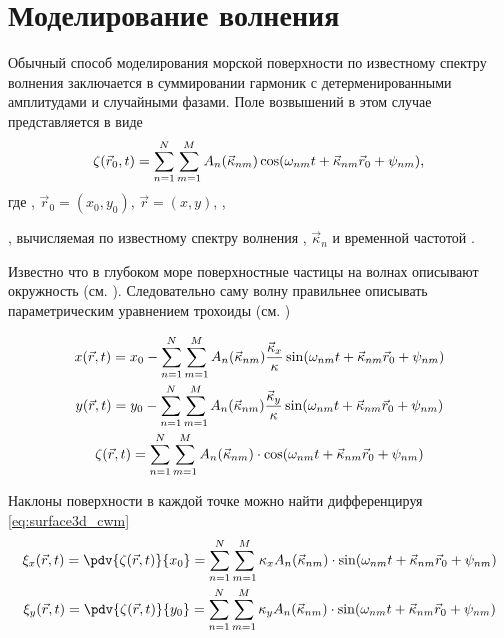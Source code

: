 \section*{Моделирование волнения}%

Обычный способ моделирования морской поверхности по известному спектру волнения
заключается в суммировании гармоник с детерменированными амплитудами и
случайными фазами. Поле возвышений в этом случае  представляется в виде
\begin{equation}
    \label{eq:surface3d_default}
    \zeta(\vec r_0,t) = \sum\limits_{n=1}^{N} \sum\limits_{m=1}^{M} A_n(\vec \kappa_{nm}) \cos(\omega_{nm}t + \vec \kappa_{nm}\vec r_0 + \psi_{nm}),    \\
\end{equation}
где ,  
$\vec r_0 = (x_0, y_0)$, $\vec r = (x, y)$, 
, 

, вычисляемая по известному спектру волнения \cite{ryabkova},
$\vec \kappa_n$ и временной частотой
 \cite{pustovoytenko}.


Известно что в глубоком море
поверхностные частицы на волнах описывают окружность (см. \cite{shuleykin}).
Следовательно саму волну правильнее описывать параметрическим уравнением
трохоиды (см. \cite{nouguier})

\begin{equation}
    \begin{gathered}
        \label{eq:surface3d_cwm}
        x(\vec r,t) = x_0 - \sum\limits_{n=1}^{N} \sum\limits_{m=1}^{M} A_n(\vec \kappa_{nm})\frac{\vec \kappa_x}{\kappa}        \sin(\omega_{nm}t + \vec \kappa_{nm}\vec r_0 + \psi_{nm})\\
        y(\vec r,t) = y_0 - \sum\limits_{n=1}^{N} \sum\limits_{m=1}^{M} A_n(\vec \kappa_{nm}) \frac{\vec \kappa_y}{\kappa}
        \sin(\omega_{nm}t + \vec \kappa_{nm}\vec r_0 + \psi_{nm})\\
        \zeta(\vec r,t) = \sum\limits_{n=1}^{N} \sum\limits_{m=1}^{M}
        A_n(\vec \kappa_{nm}) \cdot \cos(\omega_{nm}t + \vec \kappa_{nm}\vec r_0 + \psi_{nm})    \\
    \end{gathered}
\end{equation}

Наклоны поверхности в каждой точке можно найти дифференцируя
\eqref{eq:surface3d_cwm} 
\begin{equation}
    \begin{gathered}
        \xi_{x}(\vec r,t) = \pdv{\zeta(\vec r,t)}{x_0} = \fullsum \kappa_{x} A_n(\vec \kappa_{nm}) \cdot \sin(\fullphase)    \\
        \xi_{y}(\vec r,t) = \pdv{\zeta(\vec r,t)}{y_0} = \fullsum  \kappa_{y} A_n(\vec \kappa_{nm}) \cdot \sin(\fullphase)    \\
    \end{gathered}
\end{equation}

